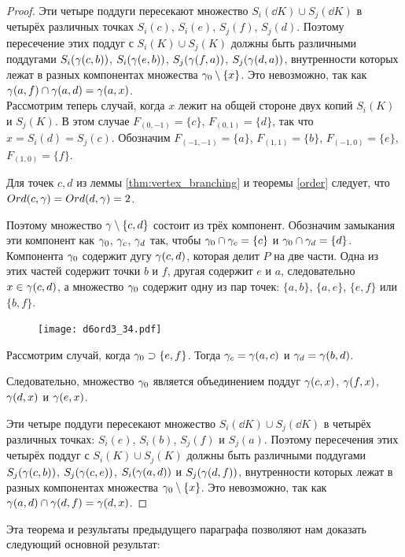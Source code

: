 \begin{proof}
Эти четыре поддуги пересекают множество $S_i(\dd K)\cup S_j(\dd K)$ в четырёх различных точках $S_i(c)$, $S_i(e)$, $S_j(f)$, $S_j(d)$. 
Поэтому пересечение этих поддуг с $S_i( K)\cup S_j(K)$ должны быть различными поддугами $S_i(\gamma(c,b))$,  $S_i(\gamma(e,b))$, $S_j(\gamma(f,a))$, $S_j(\gamma(d,a))$, внутренности которых лежат в разных компонентах множества $\gamma_0\setminus\{x\}$. 
Это невозможно, так как $\gamma(a,f)\cap\gamma(a,d)=\gamma(a,x)$.\\

Рассмотрим теперь случай, когда $x$ лежит на общей стороне двух копий $S_i(K)$ и $S_j(K)$. 
В этом случае $F_{(0,-1)}=\{c\}$, $F_{(0,1)}=\{d\}$, так что $x=S_i(d)=S_j(c)$.  
Обозначим $F_{(-1,-1)}=\{a\}$, $F_{(1 ,1)}=\{b\}$, $F_{(-1,0)}=\{e\}$, $F_{(1,0)}=\{f\}$.

Для точек $c,d$ из леммы \ref{thm:vertex_branching} и теоремы \ref{order} следует, что $Ord(c,\gamma)=Ord(d,\gamma)=2$. 

Поэтому множество $\gamma\setminus\{c,d\}$  состоит из трёх компонент. 
Обозначим замыкания эти компонент как $\gamma_0$, $\gamma_c$, $\gamma_d$ так, чтобы $\gamma_0\cap\gamma_c=\{c\}$ и $\gamma_0\cap \gamma_d=\{d\}$. 
Компонента $\gamma_0$ содержит дугу $\gamma(c,d)$, которая делит $P$ на две части. 
Одна из этих частей содержит точки $b$ и $f$, другая содержит $e$ и $a$, следовательно $x\in \gamma(c,d)$, а множество $\gamma_0$ содержит одну из пар точек: $\{a,b\}$, $\{a,e\}$, $\{e,f\}$ или $\{b,f\}$. 

\begin{figure}[H]
    \centering
    \texttt{[image: d6ord3\_34.pdf]}
\end{figure}

Рассмотрим случай, когда $\gamma_0\supset\{e,f\}$. 
Тогда $\gamma_c=\gamma(a,c)$ и $\gamma_d=\gamma(b,d)$.

Следовательно, множество $\gamma_0$ является объединением поддуг  $\gamma(c,x)$, $\gamma(f,x)$, $\gamma(d,x)$ и $\gamma(e,x)$.

Эти четыре поддуги пересекают множество $S_i(\dd K)\cup S_j(\dd K)$ в четырёх различных точках: $S_i(e)$, $S_i(b)$, $S_j(f)$ и $S_j(a)$. 
Поэтому пересечения этих четырёх поддуг с $S_i( K)\cup S_j(K)$ должны быть различными поддугами $S_j(\gamma(c,b))$, $S_j(\gamma(c,e))$, $S_i(\gamma(a,d))$ и $S_j(\gamma(d,f))$, внутренности которых лежат в разных компонентах множества $\gamma_0\setminus\{x\}$. 
Это невозможно, так как $\gamma(a,d)\cap\gamma(d,f)=\gamma(d,x)$.
\end{proof}

Эта теорема и результаты предыдущего параграфа позволяют нам доказать следующий основной результат:

